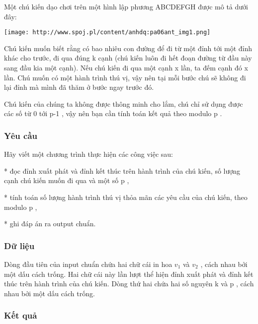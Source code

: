 



   Một chú kiến dạo chơi trên một hình lập phương ABCDEFGH được mô tả dưới đây:   



\texttt{[image: http://www.spoj.pl/content/anhdq:pa06ant\_img1.png]}



   Chú kiến muốn biết rằng có bao nhiêu con đường để đi từ một đỉnh tới một đỉnh khác cho trước, đi qua đúng       k      cạnh (chú kiến luôn đi hết đoạn đường từ đầu này sang đầu kia một cạnh). Nếu chú kiến đi qua một cạnh       x      lần, ta đếm cạnh đó       x      lần. Chú muốn có một hành trình thú vị, vậy nên tại mỗi bước chú sẽ không đi lại đỉnh mà mình đã thăm ở bước ngay trước đó.  

   Chú kiến của chúng ta không được thông minh cho lắm, chú chỉ sử dụng được các số từ       0      tới       p-1      , vậy nên bạn cần tính toán kết quả theo modulo       p      .  

\subsubsection{   Yêu cầu  }

   Hãy viết một chương trình thực hiện các công việc sau:   


   * đọc đỉnh xuất phát và đỉnh kết thúc trên hành trình của chú kiến, số lượng cạnh chú kiến muốn đi qua và một số       p      ,   


   * tính toán số lượng hành trình thú vị thỏa mãn các yêu cầu của chú kiến, theo modulo       p      ,   


   * ghi đáp án ra output chuẩn.  

\subsubsection{   Dữ liệu  }

   Dòng đầu tiên của input chuẩn chứa hai chữ cái in hoa       $v_{1}$      và       $v_{2}$      , cách nhau bởi một dấu cách trống. Hai chữ cái này lần lượt thể hiện đỉnh xuất phát và đỉnh kết thúc trên hành trình của chú kiến. Dòng thứ hai chứa hai số nguyên       k      và       p      , cách nhau bởi một dấu cách trống.  

\subsubsection{   Kết quả  }

